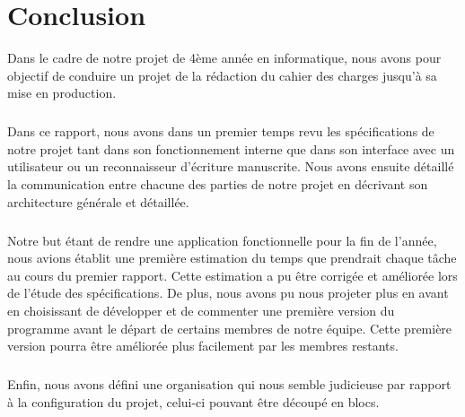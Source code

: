 \chapter{Conclusion}

Dans le cadre de notre projet de 4ème année en informatique, nous avons pour objectif de conduire un projet de la rédaction du cahier des charges jusqu’à sa mise en production.

\paragraph{}

Dans ce rapport, nous avons dans un premier temps revu les spécifications de notre projet tant dans son fonctionnement interne que dans son interface avec un utilisateur ou un reconnaisseur d’écriture manuscrite.
Nous avons ensuite détaillé la communication entre chacune des parties de notre projet en décrivant son architecture générale et détaillée.

\paragraph{}

Notre but étant de rendre une application fonctionnelle pour la fin de l’année, nous avions établit une première estimation du temps que prendrait chaque tâche au cours du premier rapport. Cette estimation a pu être corrigée et améliorée lors de l’étude des spécifications. De plus, nous avons pu nous projeter plus en avant en choisissant de développer et de commenter une première version du programme avant le départ de certains membres de notre équipe. Cette première version pourra être améliorée plus facilement par les membres restants.

\paragraph{}

Enfin, nous avons défini une organisation qui nous semble judicieuse par rapport à la configuration du projet, celui-ci pouvant être découpé en blocs.

